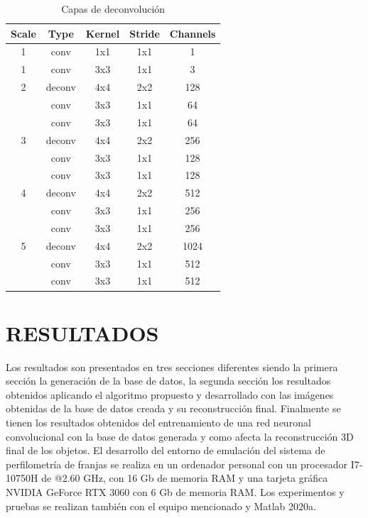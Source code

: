 \documentclass[10pt,letterpaper]{article}
\begin{document}
\begin{table}[H]
\begin{center}
\begin{tabular}{ c  c  c  c  c }
\hline
Scale & Type & Kernel & Stride & Channels\\	
\hline
1 & conv    & 1x1 & 1x1 & 1 \\
\hline
1 & conv    & 3x3 & 1x1 & 3 \\
\hline
2 & deconv  & 4x4 & 2x2 & 128 \\
  & conv    & 3x3 & 1x1 & 64 \\
  & conv    & 3x3 & 1x1 & 64 \\
\hline
3 & deconv  & 4x4 & 2x2 & 256 \\
  & conv    & 3x3 & 1x1 & 128 \\
  & conv    & 3x3 & 1x1 & 128 \\
\hline
4 & deconv  & 4x4 & 2x2 & 512 \\
  & conv    & 3x3 & 1x1 & 256 \\
  & conv    & 3x3 & 1x1 & 256 \\
\hline
5 & deconv  & 4x4 & 2x2 & 1024 \\
  & conv    & 3x3 & 1x1 & 512 \\
  & conv    & 3x3 & 1x1 & 512 \\
\hline
\end{tabular}
\caption{Capas de deconvolución}
\label{Up:}
\end{center}
\end{table}



\section{RESULTADOS}
Los resultados son presentados en tres secciones diferentes siendo la primera sección la generación de la base de datos, la segunda sección los resultados obtenidos aplicando el algoritmo propuesto y desarrollado con las imágenes obtenidas de la base de datos creada y su reconstrucción final. Finalmente se tienen los resultados obtenidos del entrenamiento de una red neuronal convolucional con la base de datos generada y como afecta la reconstrucción 3D final de los objetos. El desarrollo del entorno de emulación del sistema de perfilometría de franjas se realiza en un ordenador personal con un procesador I7-10750H de @2.60 GHz, con 16 Gb de memoria RAM y una tarjeta gráfica NVIDIA GeForce RTX 3060 con 6 Gb de memoria RAM. Los experimentos y pruebas se realizan también con el equipo mencionado y Matlab 2020a.
\end{document}

